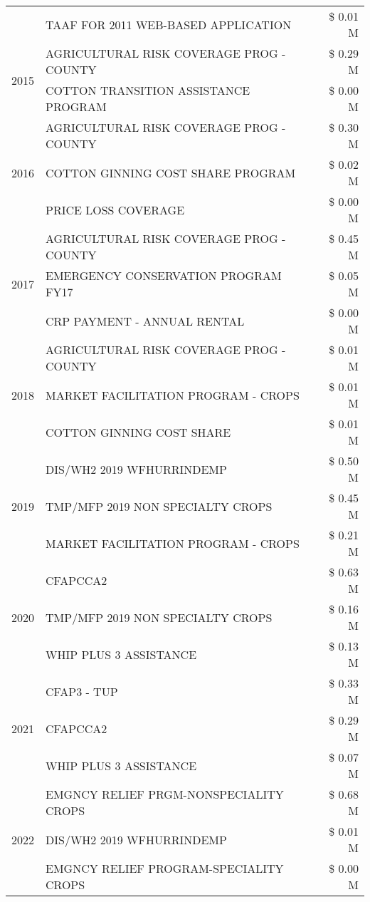 \begin{tabular}{llr}
 & TAAF FOR 2011 WEB-BASED APPLICATION & \$ 0.01 M \\
\cline{1-3}
\multirow[t]{2}{*}{2015} & AGRICULTURAL RISK COVERAGE PROG - COUNTY & \$ 0.29 M \\
 & COTTON TRANSITION ASSISTANCE PROGRAM & \$ 0.00 M \\
\cline{1-3}
\multirow[t]{3}{*}{2016} & AGRICULTURAL RISK COVERAGE PROG - COUNTY & \$ 0.30 M \\
 & COTTON GINNING COST SHARE PROGRAM & \$ 0.02 M \\
 & PRICE LOSS COVERAGE & \$ 0.00 M \\
\cline{1-3}
\multirow[t]{3}{*}{2017} & AGRICULTURAL RISK COVERAGE PROG - COUNTY & \$ 0.45 M \\
 & EMERGENCY CONSERVATION PROGRAM FY17 & \$ 0.05 M \\
 & CRP PAYMENT - ANNUAL RENTAL & \$ 0.00 M \\
\cline{1-3}
\multirow[t]{3}{*}{2018} & AGRICULTURAL RISK COVERAGE PROG - COUNTY & \$ 0.01 M \\
 & MARKET FACILITATION PROGRAM - CROPS & \$ 0.01 M \\
 & COTTON GINNING COST SHARE & \$ 0.01 M \\
\cline{1-3}
\multirow[t]{3}{*}{2019} & DIS/WH2 2019 WFHURRINDEMP & \$ 0.50 M \\
 & TMP/MFP 2019 NON SPECIALTY CROPS & \$ 0.45 M \\
 & MARKET FACILITATION PROGRAM - CROPS & \$ 0.21 M \\
\cline{1-3}
\multirow[t]{3}{*}{2020} & CFAPCCA2 & \$ 0.63 M \\
 & TMP/MFP 2019 NON SPECIALTY CROPS & \$ 0.16 M \\
 & WHIP PLUS 3 ASSISTANCE & \$ 0.13 M \\
\cline{1-3}
\multirow[t]{3}{*}{2021} & CFAP3 - TUP & \$ 0.33 M \\
 & CFAPCCA2 & \$ 0.29 M \\
 & WHIP PLUS 3 ASSISTANCE & \$ 0.07 M \\
\cline{1-3}
\multirow[t]{3}{*}{2022} & EMGNCY RELIEF PRGM-NONSPECIALITY CROPS & \$ 0.68 M \\
 & DIS/WH2 2019 WFHURRINDEMP & \$ 0.01 M \\
 & EMGNCY RELIEF PROGRAM-SPECIALITY CROPS & \$ 0.00 M \\
\cline{1-3}
\bottomrule
\end{tabular}
